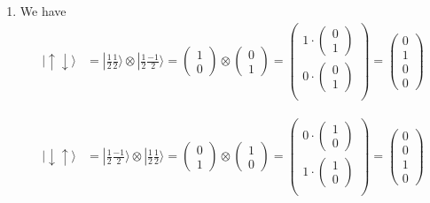\documentclass{article}
\newcommand{\ket}[1]{|#1 \rangle}
\begin{document}
\begin{enumerate}[label=(\alph*)]
  \item We have 
  \begin{align*}
    \ket{\uparrow \downarrow} &= \ket{\frac{1}{2} \frac{1}{2}} \otimes \ket{\frac{1}{2} \frac{-1}{2}} 
    = \begin{pmatrix}
      1 \\ 0
    \end{pmatrix} \otimes \begin{pmatrix}
      0 \\ 1
    \end{pmatrix} 
    = \begin{pmatrix}
      1 \cdot \begin{pmatrix}
        0 \\ 1
      \end{pmatrix} \\
      0 \cdot \begin{pmatrix}
        0 \\ 1
      \end{pmatrix} \\
    \end{pmatrix} 
    = \begin{pmatrix}
      0 \\ 1 \\ 0 \\ 0
    \end{pmatrix}
  \end{align*}

  \vskip 0.25cm
  \begin{align*}
    \ket{\downarrow \uparrow} &= \ket{\frac{1}{2} \frac{-1}{2}} \otimes \ket{\frac{1}{2} \frac{1}{2}} 
    = \begin{pmatrix}
      0 \\ 1
    \end{pmatrix} \otimes \begin{pmatrix}
      1 \\ 0
    \end{pmatrix} 
    = \begin{pmatrix}
      0 \cdot \begin{pmatrix}
         1\\ 0
      \end{pmatrix} \\
      1 \cdot \begin{pmatrix}
        1 \\ 0
      \end{pmatrix} \\
    \end{pmatrix} 
    = \begin{pmatrix}
      0 \\ 0 \\ 1 \\ 0
    \end{pmatrix}
  \end{align*}



\end{enumerate}
\end{document}
